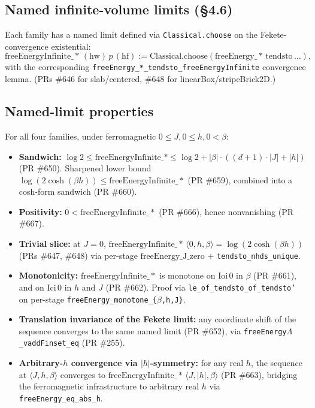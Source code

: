 \documentclass[a4paper,11pt]{article}
\newcommand{\LeanLambda}{\texorpdfstring{\ensuremath{\Lambda}}{Lambda}}
\begin{document}
\subsection{Named infinite-volume limits (\S 4.6)}

Each family has a named limit defined via \texttt{Classical.choose}
on the Fekete-convergence existential:
\[
  \mathrm{freeEnergyInfinite\_}\ast\,(\mathrm{hw})\,p\,(\mathrm{hf})
  := \mathrm{Classical.choose}(\mathrm{freeEnergy\_}\ast\,\mathrm{tendsto}\,\ldots),
\]
with the corresponding \texttt{freeEnergy\_*\_tendsto\_freeEnergyInfinite}
convergence lemma.
(PRs \#646 for slab/centered, \#648 for linearBox/stripeBrick2D.)

\subsection{Named-limit properties}

For all four families, under ferromagnetic $0 \le J, 0 \le h, 0 < \beta$:

\begin{itemize}
\item \textbf{Sandwich:} $\log 2 \le \mathrm{freeEnergyInfinite\_}\ast
  \le \log 2 + |\beta|\cdot((d+1)\cdot|J|+|h|)$
  (PR \#650). Sharpened lower bound
  $\log(2\cosh(\beta h)) \le \mathrm{freeEnergyInfinite\_}\ast$
  (PR \#659), combined into a cosh-form sandwich (PR \#660).
\item \textbf{Positivity:} $0 < \mathrm{freeEnergyInfinite\_}\ast$
  (PR \#666), hence nonvanishing (PR \#667).
\item \textbf{Trivial slice:} at $J = 0$,
  $\mathrm{freeEnergyInfinite\_}\ast\,\langle 0, h, \beta\rangle =
  \log(2\cosh(\beta h))$ (PRs \#647, \#648) via per-stage
  $\mathrm{freeEnergy\_J\_zero}$ + \texttt{tendsto\_nhds\_unique}.
\item \textbf{Monotonicity:} $\mathrm{freeEnergyInfinite\_}\ast$ is
  monotone on $\mathrm{Ioi}\,0$ in $\beta$ (PR \#661), and on
  $\mathrm{Ici}\,0$ in $h$ and $J$ (PR \#662). Proof via
  \texttt{le\_of\_tendsto\_of\_tendsto'} on per-stage
  \texttt{freeEnergy\_monotone\_\{$\beta$,h,J\}}.
\item \textbf{Translation invariance of the Fekete limit:} any
  coordinate shift of the sequence converges to the same named limit
  (PR \#652), via \texttt{freeEnergy\LeanLambda\_vaddFinset\_eq} (PR \#255).
\item \textbf{Arbitrary-$h$ convergence via $|h|$-symmetry:} for any
  real $h$, the sequence at $\langle J, h, \beta\rangle$ converges to
  $\mathrm{freeEnergyInfinite\_}\ast\,\langle J, |h|, \beta\rangle$
  (PR \#663), bridging the ferromagnetic infrastructure to arbitrary
  real $h$ via \texttt{freeEnergy\_eq\_abs\_h}.
\end{itemize}
\end{document}
